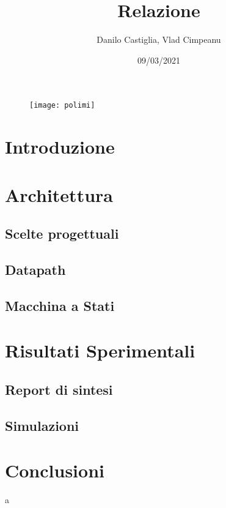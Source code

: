 \documentclass{article}
\title{Relazione}
\date{09/03/2021}
\author{Danilo Castiglia, Vlad Cimpeanu}
\begin{document}
\maketitle
{}


\begin{figure}[h!] %
\centering
  \texttt{[image: polimi]}
  \label{fig:polimi}
\end{figure}

\newpage

\section{Introduzione}


\section{Architettura}
\subsection{Scelte progettuali}

\newpage
\subsection{Datapath}

\subsection{Macchina a Stati}

\section{Risultati Sperimentali}
\subsection{Report di sintesi}
\subsection{Simulazioni}
\section{Conclusioni}

a


\end{document}
